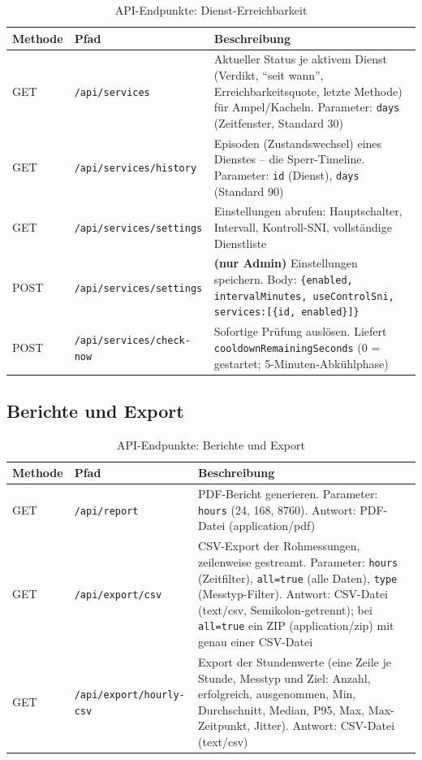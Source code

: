\begin{table}[h]
\centering
\small
\begin{tabular}{|l|l|p{7cm}|}
\hline
\textbf{Methode} & \textbf{Pfad} & \textbf{Beschreibung} \\
\hline
GET & \texttt{/api/services} & Aktueller Status je aktivem Dienst (Verdikt, \enquote{seit wann}, Erreichbarkeitsquote, letzte Methode) für Ampel/Kacheln.
  Parameter: \texttt{days} (Zeitfenster, Standard 30) \\
\hline
GET & \texttt{/api/services/history} & Episoden (Zustandswechsel) eines Dienstes -- die Sperr-Timeline.
  Parameter: \texttt{id} (Dienst), \texttt{days} (Standard 90) \\
\hline
GET & \texttt{/api/services/settings} & Einstellungen abrufen: Hauptschalter, Intervall, Kontroll-SNI, vollständige Dienstliste \\
\hline
POST & \texttt{/api/services/settings} & \textbf{(nur Admin)} Einstellungen speichern.
  Body: \texttt{\{enabled, intervalMinutes, useControlSni, services:[\{id, enabled\}]\}} \\
\hline
POST & \texttt{/api/services/check-now} & Sofortige Prüfung auslösen.
  Liefert \texttt{cooldownRemainingSeconds} (0 = gestartet; 5-Minuten-Abkühlphase) \\
\hline
\end{tabular}
\caption{API-Endpunkte: Dienst-Erreichbarkeit}
\end{table}

\subsection{Berichte und Export}

\begin{table}[h]
\centering
\small
\begin{tabular}{|l|l|p{7cm}|}
\hline
\textbf{Methode} & \textbf{Pfad} & \textbf{Beschreibung} \\
\hline
GET & \texttt{/api/report} & PDF-Bericht generieren.
  Parameter: \texttt{hours} (24, 168, 8760).
  Antwort: PDF-Datei (application/pdf) \\
\hline
GET & \texttt{/api/export/csv} & CSV-Export der Rohmessungen, zeilenweise gestreamt.
  Parameter: \texttt{hours} (Zeitfilter), \texttt{all=true} (alle Daten),
  \texttt{type} (Messtyp-Filter).
  Antwort: CSV-Datei (text/csv, Semikolon-getrennt); bei \texttt{all=true} ein ZIP
  (application/zip) mit genau einer CSV-Datei \\
\hline
GET & \texttt{/api/export/hourly-csv} & Export der Stundenwerte (eine Zeile je Stunde,
  Messtyp und Ziel: Anzahl, erfolgreich, ausgenommen, Min, Durchschnitt, Median, P95, Max,
  Max-Zeitpunkt, Jitter). Antwort: CSV-Datei (text/csv) \\
\hline
\end{tabular}
\caption{API-Endpunkte: Berichte und Export}
\end{table}

